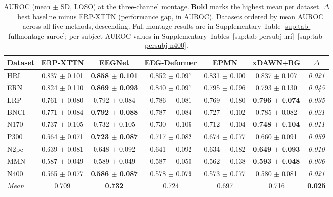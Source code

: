 \begin{table}[t]
\centering
\setlength{\tabcolsep}{5pt}
\caption{AUROC (mean $\pm$ SD, LOSO) at the three-channel montage. \textbf{Bold} marks the highest mean per dataset. $\Delta$ = best baseline minus ERP-XTTN (performance gap, in AUROC). Datasets ordered by mean AUROC across all five methods, descending. Full-montage results are in Supplementary Table~\ref{sup:tab-fullmontage-auroc}; per-subject AUROC values in Supplementary Tables~\ref{sup:tab-persubj-hri}--\ref{sup:tab-persubj-n400}.}
\label{tab:auroc}
\begin{tabular}{lcccccc}
\toprule
Dataset & ERP-XTTN & EEGNet & EEG-Deformer & EPMN & xDAWN+RG & $\Delta$ \\
\midrule
HRI & 0.837 $\pm$ 0.101 & \textbf{0.858 $\pm$ 0.101} & 0.852 $\pm$ 0.097 & 0.831 $\pm$ 0.100 & 0.837 $\pm$ 0.107 & \textit{0.021} \\
ERN & 0.824 $\pm$ 0.110 & \textbf{0.869 $\pm$ 0.093} & 0.840 $\pm$ 0.097 & 0.795 $\pm$ 0.096 & 0.793 $\pm$ 0.130 & \textit{0.045} \\
LRP & 0.761 $\pm$ 0.080 & 0.792 $\pm$ 0.084 & 0.786 $\pm$ 0.081 & 0.769 $\pm$ 0.080 & \textbf{0.796 $\pm$ 0.074} & \textit{0.035} \\
BNCI & 0.771 $\pm$ 0.084 & \textbf{0.792 $\pm$ 0.088} & 0.787 $\pm$ 0.084 & 0.727 $\pm$ 0.102 & 0.785 $\pm$ 0.082 & \textit{0.021} \\
N170 & 0.737 $\pm$ 0.105 & 0.732 $\pm$ 0.105 & 0.730 $\pm$ 0.106 & 0.712 $\pm$ 0.104 & \textbf{0.748 $\pm$ 0.104} & \textit{0.011} \\
P300 & 0.664 $\pm$ 0.071 & \textbf{0.723 $\pm$ 0.087} & 0.717 $\pm$ 0.082 & 0.674 $\pm$ 0.077 & 0.660 $\pm$ 0.091 & \textit{0.059} \\
N2pc & 0.639 $\pm$ 0.081 & 0.648 $\pm$ 0.092 & 0.641 $\pm$ 0.092 & 0.634 $\pm$ 0.082 & \textbf{0.649 $\pm$ 0.093} & \textit{0.010} \\
MMN & 0.587 $\pm$ 0.049 & 0.589 $\pm$ 0.049 & 0.587 $\pm$ 0.050 & 0.562 $\pm$ 0.038 & \textbf{0.593 $\pm$ 0.048} & \textit{0.006} \\
N400 & 0.565 $\pm$ 0.077 & \textbf{0.586 $\pm$ 0.087} & 0.578 $\pm$ 0.079 & 0.573 $\pm$ 0.077 & 0.580 $\pm$ 0.081 & \textit{0.021} \\
\midrule
\textit{Mean} & 0.709 & \textbf{0.732} & 0.724 & 0.697 & 0.716 & \textbf{0.025} \\
\bottomrule
\end{tabular}
\end{table}
